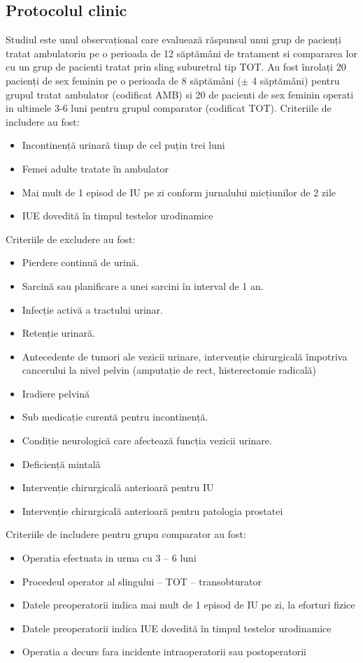 \documentclass[12pt]{article}
\begin{document}
\subsection{Protocolul clinic}
  Studiul este unul observațional care evaluează răspunsul unui grup de pacienți tratat ambulatoriu pe o perioada de 12 săptămâni de tratament si compararea lor cu un grup de pacienti tratat prin sling suburetral tip \ac{TOT}. Au fost înrolați 20 pacienți de sex feminin pe o perioada de 8 săptămâni ($\pm$ 4 săptămâni) pentru grupul tratat ambulator (codificat AMB) si 20 de pacienti de sex feminin operati in ultimele 3-6 luni pentru grupul comparator (codificat TOT). Criteriile de includere au fost:
  \begin{itemize}
    \item Incontinență urinară timp de cel puțin trei luni
    \item Femei adulte tratate în ambulator
    \item Mai mult de 1 episod de IU pe zi conform jurnalului micțiunilor de 2 zile
    \item IUE dovedită în timpul testelor urodinamice
   \end{itemize}
 
 Criteriile de excludere au fost:
  \begin{itemize}
    \item Pierdere continuă de urină.
    \item Sarcină sau planificare a unei sarcini în interval de 1 an.
    \item Infecție activă a tractului urinar.
    \item Retenție urinară.
    \item Antecedente de tumori ale vezicii urinare, intervenție chirurgicală împotriva cancerului la nivel pelvin (amputație de rect, histerectomie radicală)
    \item Iradiere pelvină
    \item Sub medicație curentă pentru incontinență.
    \item Condiție neurologică care afectează funcția vezicii urinare.
    \item Deficiență mintală 
    \item Intervenție chirurgicală anterioară pentru IU
    \item Intervenție chirurgicală anterioară pentru patologia prostatei 
   \end{itemize}
   
   Criteriile de includere pentru grupu comparator au fost:
  \begin{itemize}
    \item Operatia efectuata in urma cu 3 – 6 luni
    \item Procedeul operator al slingului – TOT – transobturator
    \item Datele preoperatorii indica mai mult de 1 episod de IU pe zi, la eforturi fizice
    \item Datele preoperatorii indica IUE dovedită în timpul testelor urodinamice
    \item Operatia a decurs fara incidente intraoperatorii sau postoperatorii
   \end{itemize}
\end{document}
